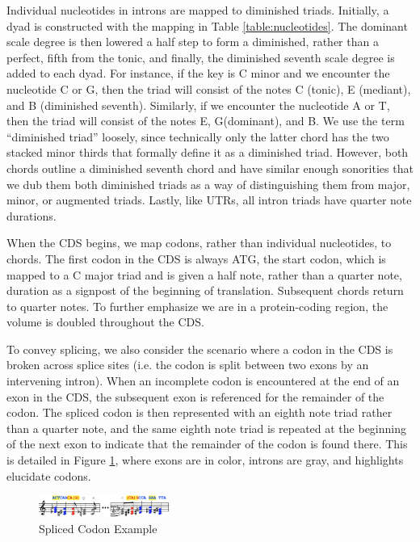 \documentclass[letterpaper]{article}
\begin{document}
Individual nucleotides in introns are mapped to diminished triads. Initially, a dyad is constructed with the mapping in Table \ref{table:nucleotides}. The dominant scale degree is then lowered a half step to form a diminished, rather than a perfect, fifth from the tonic, and finally, the diminished seventh scale degree is added to each dyad. For instance, if the key is C minor and we encounter the nucleotide C or G, then the triad will consist of the notes C (tonic), E\musFlat\; (mediant), and B\musDoubleFlat\; (diminished seventh). Similarly, if we encounter the nucleotide A or T, then the triad will consist of the notes E\musFlat, G\musFlat (dominant), and B\musDoubleFlat. We use the term “diminished triad” loosely, since technically only the latter chord has the two stacked minor thirds that formally define it as a diminished triad. However, both chords outline a diminished seventh chord and have similar enough sonorities that we dub them both diminished triads as a way of distinguishing them from major, minor, or augmented triads. Lastly, like UTRs, all intron triads have quarter note durations.

When the CDS begins, we map codons, rather than individual nucleotides, to chords. The first codon in the CDS is always ATG, the start codon, which is mapped to a C major triad and is given a half note, rather than a quarter note, duration as a signpost of the beginning of translation. Subsequent chords return to quarter notes. To further emphasize we are in a protein-coding region, the volume is doubled throughout the CDS.

To convey splicing, we also consider the scenario where a codon in the CDS is broken across splice sites (i.e. the codon is split between two exons by an intervening intron). When an incomplete codon is encountered at the end of an exon in the CDS, the subsequent exon is referenced for the remainder of the codon. The spliced codon is then represented with an eighth note triad rather than a quarter note, and the same eighth note triad is repeated at the beginning of the next exon to indicate that the remainder of the codon is found there. This is detailed in Figure \ref{fig:splice_site_example}, where exons are in color, introns are gray, and highlights elucidate codons. 

\begin{figure}[h!]
\centering
\vspace{-3mm}
\includegraphics[width=0.38\textwidth]{images/splice_site_example}
  \caption{Spliced Codon Example}
  \label{fig:splice_site_example}
  \vspace{-3mm}
\end{figure}
\end{document}
